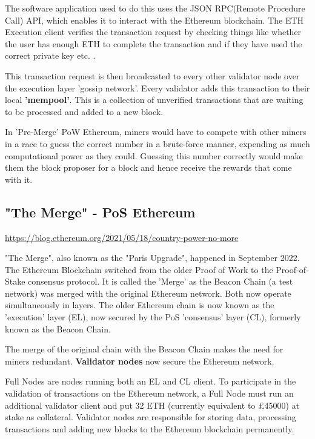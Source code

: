 The software application used to do this uses the JSON RPC(Remote Procedure Call) API, which enables it to interact with the Ethereum blockchain. The ETH Execution client verifies the transaction request by checking things like whether the user has enough ETH to complete the transaction and if they have used the correct private key etc. \cite{EthereumEthereum.org}. 

This transaction request is then broadcasted to every other validator node over the execution layer 'gossip network'. Every validator adds this transaction to their local \textbf{'mempool'}. This is a collection of unverified transactions that are waiting to be processed and added to a new block.

In 'Pre-Merge' PoW Ethereum, miners would have to compete with other miners in a race to guess the correct number in a brute-force manner, expending as much computational power as they could. Guessing this number correctly would make them the block proposer for a block and hence receive the rewards that come with it.

\subsection{"The Merge" - PoS Ethereum}

\url{https://blog.ethereum.org/2021/05/18/country-power-no-more}

"The Merge", also known as the "Paris Upgrade", happened in September 2022. The Ethereum Blockchain switched from the older Proof of Work to the Proof-of-Stake consensus protocol. It is called the 'Merge' as the Beacon Chain (a test network) was merged with the original Ethereum network. Both now operate simultaneously in layers. The older Ethereum chain is now known as the 'execution' layer (EL), now secured by the PoS 'consensus' layer (CL), formerly known as the Beacon Chain. 

The merge of the original chain with the Beacon Chain makes the need for miners redundant. \textbf{Validator nodes} now secure the Ethereum network. 

Full Nodes are nodes running both an EL and CL client. To participate in the validation of transactions on the Ethereum network, a Full Node must run an additional validator client and put 32 ETH (currently equivalent to £45000) at stake as collateral. Validator nodes are responsible for storing data, processing transactions and adding new blocks to the Ethereum blockchain permanently. 

